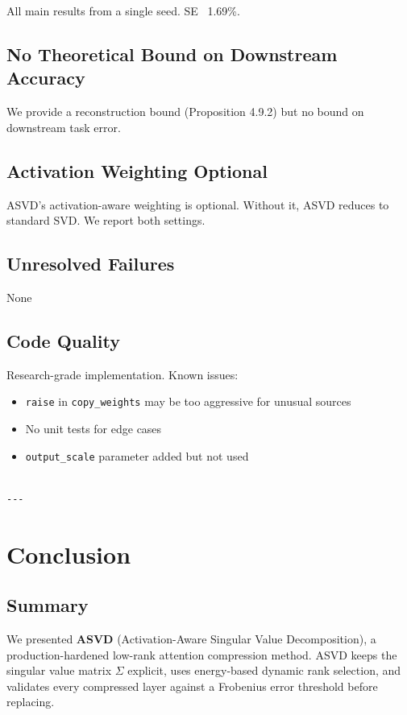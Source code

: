 All main results from a single seed. SE ~1.69\%.

\subsection{No Theoretical Bound on Downstream Accuracy}

We provide a reconstruction bound (Proposition 4.9.2) but no bound on 
downstream task error.

\subsection{Activation Weighting Optional}

ASVD's activation-aware weighting is optional. Without it, ASVD reduces 
to standard SVD. We report both settings.

\subsection{Unresolved Failures}

None

\subsection{Code Quality}

Research-grade implementation. Known issues:
\begin{itemize}
\item \texttt{raise} in \texttt{copy\_weights} may be too aggressive for unusual sources
\item No unit tests for edge cases
\item \texttt{output\_scale} parameter added but not used
\end{itemize}
\begin{lstlisting}

---
\end{lstlisting}


\section{Conclusion}

\subsection{Summary}

We presented \textbf{ASVD} (Activation-Aware Singular Value Decomposition), a 
production-hardened low-rank attention compression method. ASVD keeps the 
singular value matrix $\Sigma$ explicit, uses energy-based dynamic rank 
selection, and validates every compressed layer against a Frobenius error 
threshold before replacing.

